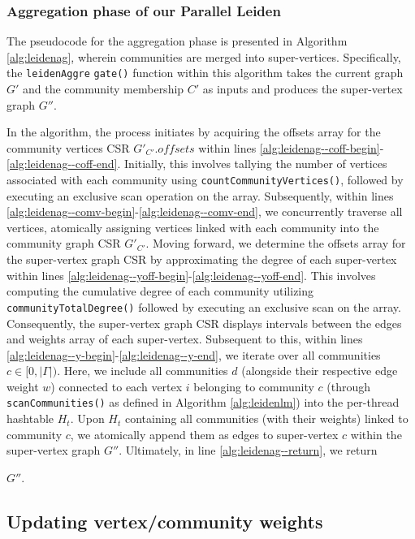 \subsubsection{Aggregation phase of our Parallel Leiden}

The pseudocode for the aggregation phase is presented in Algorithm \ref{alg:leidenag}, wherein communities are merged into super-vertices. Specifically, the \texttt{leidenAggre} \texttt{gate()} function within this algorithm takes the current graph $G'$ and the community membership $C'$ as inputs and produces the super-vertex graph $G''$.



In the algorithm, the process initiates by acquiring the offsets array for the community vertices CSR $G'_{C'}.offsets$ within lines \ref{alg:leidenag--coff-begin}-\ref{alg:leidenag--coff-end}. Initially, this involves tallying the number of vertices associated with each community using \texttt{countCommunityVertices()}, followed by executing an exclusive scan operation on the array. Subsequently, within lines \ref{alg:leidenag--comv-begin}-\ref{alg:leidenag--comv-end}, we concurrently traverse all vertices, atomically assigning vertices linked with each community into the community graph CSR $G'_{C'}$. Moving forward, we determine the offsets array for the super-vertex graph CSR by approximating the degree of each super-vertex within lines \ref{alg:leidenag--yoff-begin}-\ref{alg:leidenag--yoff-end}. This involves computing the cumulative degree of each community utilizing \texttt{communityTotalDegree()} followed by executing an exclusive scan on the array. Consequently, the super-vertex graph CSR displays intervals between the edges and weights array of each super-vertex. Subsequent to this, within lines \ref{alg:leidenag--y-begin}-\ref{alg:leidenag--y-end}, we iterate over all communities $c \in [0, |\Gamma|)$. Here, we include all communities $d$ (alongside their respective edge weight $w$) connected to each vertex $i$ belonging to community $c$ (through \texttt{scanCommunities()} as defined in Algorithm \ref{alg:leidenlm}) into the per-thread hashtable $H_t$. Upon $H_t$ containing all communities (with their weights) linked to community $c$, we atomically append them as edges to super-vertex $c$ within the super-vertex graph $G''$. Ultimately, in line \ref{alg:leidenag--return}, we return $G''$.


\subsection{Updating vertex/community weights}
\label{sec:our-update}

